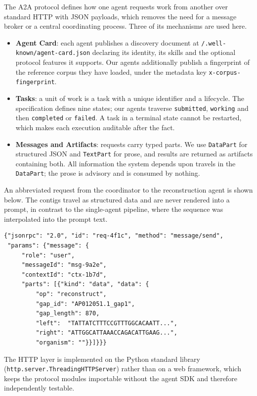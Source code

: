 The A2A protocol defines how one agent requests work from another over standard HTTP with
JSON payloads, which removes the need for a message broker or a central coordinating
process. Three of its mechanisms are used here.

\begin{itemize}
    \item \textbf{Agent Card}: each agent publishes a discovery document at
    \texttt{/.well-known/agent-card.json} declaring its identity, its skills and the
    optional protocol features it supports. Our agents additionally publish a fingerprint
    of the reference corpus they have loaded, under the metadata key
    \texttt{x-corpus-fingerprint}.

    \item \textbf{Tasks}: a unit of work is a task with a unique identifier and a lifecycle.
    The specification defines nine states; our agents traverse \texttt{submitted},
    \texttt{working} and then \texttt{completed} or \texttt{failed}. A task in a terminal
    state cannot be restarted, which makes each execution auditable after the fact.

    \item \textbf{Messages and Artifacts}: requests carry typed parts. We use
    \texttt{DataPart} for structured JSON and \texttt{TextPart} for prose, and results are
    returned as artifacts containing both. All information the system depends upon travels
    in the \texttt{DataPart}; the prose is advisory and is consumed by nothing.
\end{itemize}

An abbreviated request from the coordinator to the reconstruction agent is shown below. The
contigs travel as structured data and are never rendered into a prompt, in contrast to the
single-agent pipeline, where the sequence was interpolated into the prompt text.

\begin{verbatim}
{"jsonrpc": "2.0", "id": "req-4f1c", "method": "message/send",
 "params": {"message": {
     "role": "user",
     "messageId": "msg-9a2e",
     "contextId": "ctx-1b7d",
     "parts": [{"kind": "data", "data": {
         "op": "reconstruct",
         "gap_id": "AP012051.1_gap1",
         "gap_length": 870,
         "left":  "TATTATCTTTCCGTTTGGCACAATT...",
         "right": "ATTGGCATTAAACCAGACATTGAAG...",
         "organism": ""}}]}}}
\end{verbatim}

The HTTP layer is implemented on the Python standard library
(\texttt{http.server.ThreadingHTTPServer}) rather than on a web framework, which keeps the
protocol modules importable without the agent SDK and therefore independently testable.

